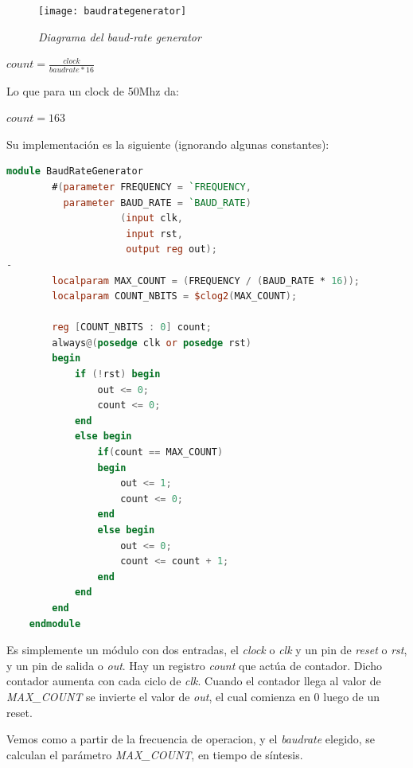 \documentclass{article}
\begin{document}
\begin{figure}[H]
    \begin{center}
        \texttt{[image: baudrategenerator]}
        \caption{\textit{Diagrama del baud-rate generator}}
    \end{center}
\end{figure}

\begin{center}
    $ count = \frac{clock}{baudrate * 16} $
\end{center}

Lo que para un clock de 50Mhz da:

\begin{center}
    $ count = 163 $
\end{center}

Su implementación es la siguiente (ignorando algunas constantes):

\begin{lstlisting}[language=Verilog]
    module BaudRateGenerator
        #(parameter FREQUENCY = `FREQUENCY,
          parameter BAUD_RATE = `BAUD_RATE)
                    (input clk,
                     input rst,
                     output reg out);
-
        localparam MAX_COUNT = (FREQUENCY / (BAUD_RATE * 16));
        localparam COUNT_NBITS = $clog2(MAX_COUNT);

        reg [COUNT_NBITS : 0] count;
        always@(posedge clk or posedge rst)
        begin
            if (!rst) begin
                out <= 0;
                count <= 0;
            end
            else begin
                if(count == MAX_COUNT)
                begin
                    out <= 1;
                    count <= 0;
                end
                else begin
                    out <= 0;
                    count <= count + 1;
                end
            end
        end
    endmodule
\end{lstlisting}

Es simplemente un módulo con dos entradas, el \textit{clock} o \textit{clk} y un pin de \textit{reset} o \textit{rst}, y
un pin de salida o \textit{out}.
Hay un registro \textit{count} que actúa de contador. Dicho contador aumenta con cada ciclo de \textit{clk}.
Cuando el contador llega al valor de \textit{MAX\_COUNT} se invierte el valor de \textit{out}, el cual comienza en 0
luego de un reset.

Vemos como a partir de la frecuencia de operacion, y el \textit{baudrate} elegido,
se calculan el parámetro \textit{MAX\_COUNT}, en tiempo de síntesis.
\end{document}
